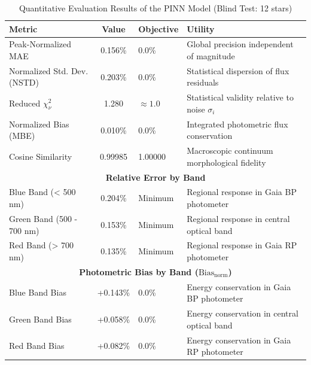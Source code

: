 
\begin{table}[htpb]
\centering
\caption{Quantitative Evaluation Results of the PINN Model (Blind Test: 12 stars)}
\label{tab:pinn_evaluation}
\begin{tabular}{lcll}
\hline
\textbf{Metric} & \textbf{Value} & \textbf{Objective} & \textbf{Utility} \\
\hline
Peak-Normalized MAE & 0.156\% & 0.0\% & Global precision independent of magnitude \\
Normalized Std. Dev. (NSTD) & 0.203\% & 0.0\% & Statistical dispersion of flux residuals \\
Reduced $\chi^2_\nu$ & 1.280 & $\approx 1.0$ & Statistical validity relative to noise $\sigma_i$ \\
Normalized Bias (MBE) & 0.010\% & 0.0\% & Integrated photometric flux conservation \\
Cosine Similarity & 0.99985 & 1.00000 & Macroscopic continuum morphological fidelity \\
\hline
\multicolumn{4}{c}{\textbf{Relative Error by Band}} \\
\hline
Blue Band (< 500 nm) & 0.204\% & Minimum & Regional response in Gaia BP photometer \\
Green Band (500 - 700 nm) & 0.153\% & Minimum & Regional response in central optical band \\
Red Band (> 700 nm) & 0.135\% & Minimum & Regional response in Gaia RP photometer \\
\hline
\multicolumn{4}{c}{\textbf{Photometric Bias by Band ($\text{Bias}_{\text{norm}}$)}} \\
\hline
Blue Band Bias & +0.143\% & 0.0\% & Energy conservation in Gaia BP photometer \\
Green Band Bias & +0.058\% & 0.0\% & Energy conservation in central optical band \\
Red Band Bias & +0.082\% & 0.0\% & Energy conservation in Gaia RP photometer \\
\hline
\end{tabular}
\end{table}
